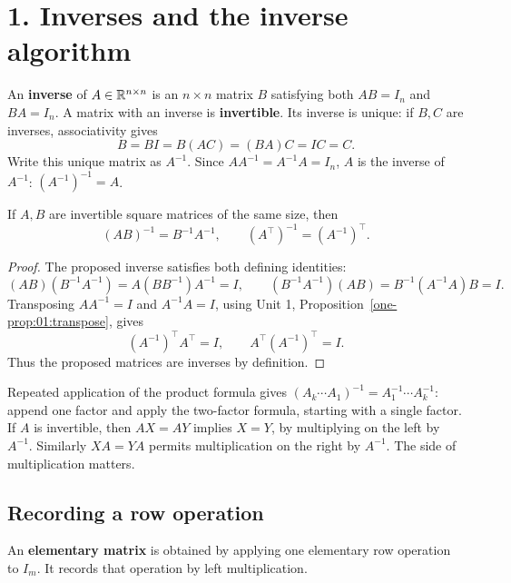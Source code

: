 \section*{1. Inverses and the inverse algorithm}

An \textbf{inverse} of \(A\in\mathbb R^{n\times n}\) is an \(n\times n\) matrix
\(B\) satisfying both \(AB=I_n\) and \(BA=I_n\). A matrix with an
inverse is \textbf{invertible}. Its inverse is unique: if \(B,C\) are
inverses, associativity gives
\[
B=BI=B(AC)=(BA)C=IC=C.
\]
Write this unique matrix as \(A^{-1}\). Since
\(AA^{-1}=A^{-1}A=I_n\), \(A\) is the inverse of \(A^{-1}\):
\((A^{-1})^{-1}=A\).

\begin{proposition}\label{prop:02:inverse-laws}
If \(A,B\) are invertible square matrices of the same size, then
\[
(AB)^{-1}=B^{-1}A^{-1},\qquad (A^\top)^{-1}=(A^{-1})^\top.
\]
\end{proposition}
\begin{proof}
The proposed inverse satisfies both defining identities:
\[
(AB)(B^{-1}A^{-1})=A(BB^{-1})A^{-1}=I,\qquad
(B^{-1}A^{-1})(AB)=B^{-1}(A^{-1}A)B=I.
\]
Transposing \(AA^{-1}=I\) and \(A^{-1}A=I\), using
Unit 1, Proposition~\ref{one-prop:01:transpose}, gives
\[
(A^{-1})^\top A^\top=I,\qquad A^\top(A^{-1})^\top=I.
\]
Thus the proposed matrices are inverses by definition.
\end{proof}
Repeated application of the product formula gives
\((A_k\cdots A_1)^{-1}=A_1^{-1}\cdots A_k^{-1}\): append one factor
and apply the two-factor formula, starting with a single factor.
If \(A\) is invertible, then \(AX=AY\) implies \(X=Y\), by multiplying
on the left by \(A^{-1}\). Similarly \(XA=YA\) permits multiplication
on the right by \(A^{-1}\). The side of multiplication matters.

\subsection*{Recording a row operation}
An \textbf{elementary matrix} is obtained by applying one elementary
row operation to \(I_m\). It records that operation by left multiplication.

